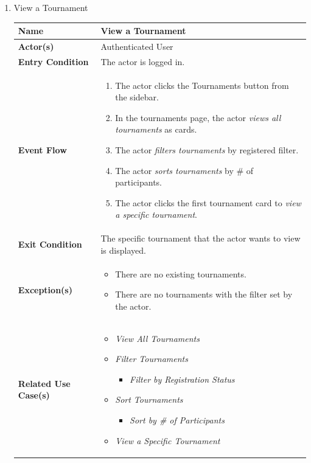 \begin{enumerate}
\item View a Tournament
    \begin{center}
    \begin{tabular}{ | m{10em} | m{10cm}| } 
      \hline
      \textbf{Name} & View a Tournament  \\ 
      \hline
      \textbf{Actor(s)} & Authenticated User \\ 
      \hline
      \textbf{Entry Condition} & The actor is logged in. \\ 
      \hline
      \textbf{Event Flow} & 
          \begin{enumerate}[(1)]
              \item The actor clicks the Tournaments button from the sidebar.
              \item In the tournaments page, the actor \textit{views all tournaments} as cards.
              \item The actor \textit{filters tournaments} by registered filter.
              \item The actor \textit{sorts tournaments} by \# of participants.
              \item The actor clicks the first tournament card to \textit{view a specific tournament}.
          \end{enumerate}
      \\ 
      \hline
      \textbf{Exit Condition} & The specific tournament that the actor wants to view is displayed.  \\ 
      \hline
      \textbf{Exception(s)} & 
      \begin{itemize}
          \item There are no existing tournaments.
          \item There are no tournaments with the filter set by the actor.
      \end{itemize}
          \\ 
      \hline
      \textbf{Related Use Case(s)} & 
      \begin{itemize}
          \item \textit{View All Tournaments}
          \item \textit{Filter Tournaments}
          \begin{itemize}
              \item \textit{Filter by Registration Status}
          \end{itemize}
          \item \textit{Sort Tournaments}
          \begin{itemize}
            \item \textit{Sort by \# of Participants}
          \end{itemize}
          \item \textit{View a Specific Tournament}
      \end{itemize}
          \\ 
      \hline
    \end{tabular}
\end{center}


\end{enumerate}

